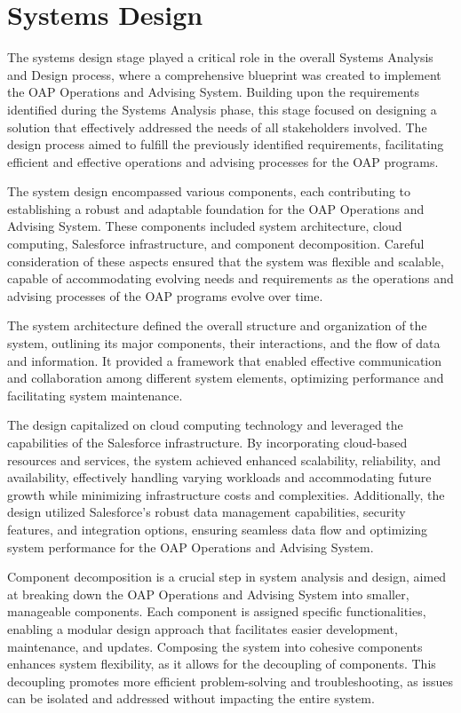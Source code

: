 \documentclass[12pt]{article}
\begin{document}
\newpage

\section{Systems Design}
The systems design stage played a critical role in the overall Systems Analysis and Design process, where a comprehensive blueprint was created to implement the OAP Operations and Advising System. Building upon the requirements identified during the Systems Analysis phase, this stage focused on designing a solution that effectively addressed the needs of all stakeholders involved. The design process aimed to fulfill the previously identified requirements, facilitating efficient and effective operations and advising processes for the OAP programs.

The system design encompassed various components, each contributing to establishing a robust and adaptable foundation for the OAP Operations and Advising System. These components included system architecture, cloud computing, Salesforce infrastructure, and component decomposition. Careful consideration of these aspects ensured that the system was flexible and scalable, capable of accommodating evolving needs and requirements as the operations and advising processes of the OAP programs evolve over time.

The system architecture defined the overall structure and organization of the system, outlining its major components, their interactions, and the flow of data and information. It provided a framework that enabled effective communication and collaboration among different system elements, optimizing performance and facilitating system maintenance.

The design capitalized on cloud computing technology and leveraged the capabilities of the Salesforce infrastructure. By incorporating cloud-based resources and services, the system achieved enhanced scalability, reliability, and availability, effectively handling varying workloads and accommodating future growth while minimizing infrastructure costs and complexities. Additionally, the design utilized Salesforce's robust data management capabilities, security features, and integration options, ensuring seamless data flow and optimizing system performance for the OAP Operations and Advising System.

Component decomposition is a crucial step in system analysis and design, aimed at breaking down the OAP Operations and Advising System into smaller, manageable components. Each component is assigned specific functionalities, enabling a modular design approach that facilitates easier development, maintenance, and updates. Composing the system into cohesive components enhances system flexibility, as it allows for the decoupling of components. This decoupling promotes more efficient problem-solving and troubleshooting, as issues can be isolated and addressed without impacting the entire system.
\end{document}
